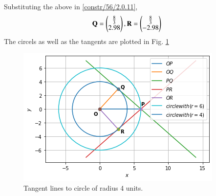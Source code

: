 Substituting the above in \eqref{constr/56/2.0.11},
%
\begin{align}
\mathbf{Q}=\begin{pmatrix}\frac{8}{3}\\2.98\end{pmatrix},
\mathbf{R}=\begin{pmatrix}\frac{8}{3}\\-2.98\end{pmatrix}
\end{align}
The circels as well as the tangents are plotted in Fig.     \ref{fig:constr/56/Tangent}
%
\begin{figure}[ht]
    \centering
    \includegraphics[width=\columnwidth]{solutions/circle/56/TANGENT.png}
    \caption{Tangent lines to circle of radius 4 units.}
    \label{fig:constr/56/Tangent}
\end{figure}    



